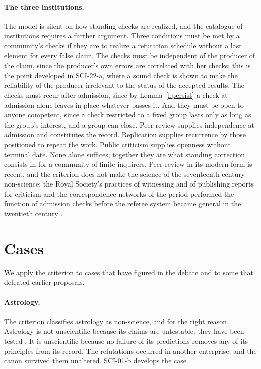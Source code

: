 \documentclass{situationist-preprint}
\begin{document}
\paragraph{The three institutions.} The model is silent on how standing checks are realized, and the catalogue of institutions requires a further argument. Three conditions must be met by a community's checks if they are to realize a refutation schedule without a last element for every false claim. The checks must be independent of the producer of the claim, since the producer's own errors are correlated with her checks; this is the point developed in SCI-22-a, where a sound check is shown to make the reliability of the producer irrelevant to the status of the accepted results. The checks must recur after admission, since by Lemma~\ref{l:persist} a check at admission alone leaves in place whatever passes it. And they must be open to anyone competent, since a check restricted to a fixed group lasts only as long as the group's interest, and a group can close. Peer review supplies independence at admission and constitutes the record. Replication supplies recurrence by those positioned to repeat the work. Public criticism supplies openness without terminal date. None alone suffices; together they are what standing correction consists in for a community of finite inquirers. Peer review in its modern form is recent, and the criterion does not make the science of the seventeenth century non-science: the Royal Society's practices of witnessing and of publishing reports for criticism \citep{ShapinSchaffer1985} and the correspondence networks of the period performed the function of admission checks before the referee system became general in the twentieth century \citep{Csiszar2016}.

\section{Cases}\label{s:cases}

We apply the criterion to cases that have figured in the debate and to some that defeated earlier proposals.

\paragraph{Astrology.} The criterion classifies astrology as non-science, and for the right reason. Astrology is not unscientific because its claims are untestable; they have been tested \citep{Carlson1985}. It is unscientific because no failure of its predictions removes any of its principles from its record. The refutations occurred in another enterprise, and the canon survived them unaltered. SCI-01-b develops the case.
\end{document}
